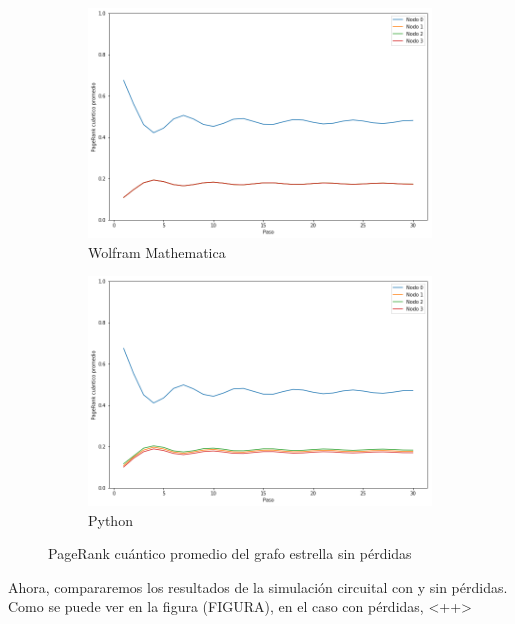 \begin{figure}[H]
    \centering
    \begin{subfigure}[m]{0.45\textwidth}
        \centering
        \includegraphics[width=0.9\linewidth]{img/star-mean-M.png}
        \caption{Wolfram Mathematica}
    \end{subfigure}
    \begin{subfigure}[m]{0.45\textwidth}
        \centering
        \includegraphics[width=0.9\linewidth]{img/star-mean-lossless.png}
        \caption{Python}
    \end{subfigure}
    \caption[PageRank cuántico promedio del grafo estrella sin pérdidas]{PageRank cuántico promedio del grafo estrella sin pérdidas}
    \label{fig:meanstarlossless}
\end{figure}

Ahora, compararemos los resultados de la simulación circuital con y sin pérdidas. Como se puede ver en la figura (FIGURA), en el caso con pérdidas, <++>

